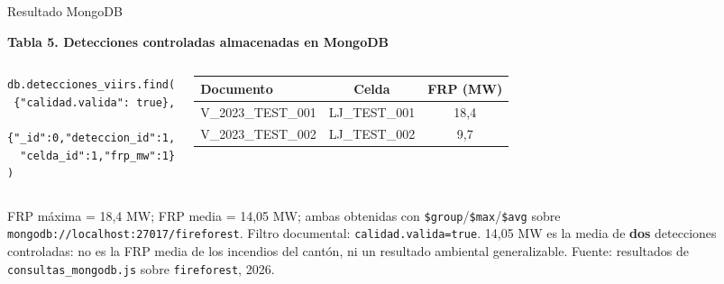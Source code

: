 \documentclass[aspectratio=169,11pt]{beamer}
\newcommand{\fuente}[1]{{\vfill\tiny\color{GrisTexto!70!black} Fuente: #1}}
\begin{document}
\begin{frame}[fragile]{Resultado MongoDB}
  \begin{center}
  \end{center}
  \vspace{0.15cm}
  \raggedright{\small\textbf{Tabla 5. Detecciones controladas almacenadas en MongoDB}\par}
  \vspace{0.05cm}
  \begin{columns}[T]
      \begin{footnotesize}
      \begin{verbatim}
db.detecciones_viirs.find(
 {"calidad.valida": true},
 {"_id":0,"deteccion_id":1,
  "celda_id":1,"frp_mw":1}
)
      \end{verbatim}
      \end{footnotesize}
      \scriptsize
      \begin{tabular}{@{}lcc@{}}
      \toprule
      \textbf{Documento} & \textbf{Celda} & \textbf{FRP (MW)} \\
      \midrule
      V\_2023\_TEST\_001 & LJ\_TEST\_001 & 18,4 \\
      V\_2023\_TEST\_002 & LJ\_TEST\_002 & 9,7 \\
      \bottomrule
      \end{tabular}
  \end{columns}
  \vspace{0.2cm}
  {\scriptsize FRP m\'axima = 18,4 MW; FRP media = 14,05 MW; ambas obtenidas con \texttt{\$group}/\texttt{\$max}/\texttt{\$avg} sobre \texttt{mongodb://localhost:27017/fireforest}. Filtro documental: \texttt{calidad.\allowbreak valida=true}.}
  \vspace{0.1cm}
  {\scriptsize\color{Fuego} 14,05 MW es la media de \textbf{dos} detecciones controladas: no es la FRP media de los incendios del cant\'on, ni un resultado ambiental generalizable.}
  \fuente{resultados de \texttt{consultas\_mongodb.js} sobre \texttt{fireforest}, 2026.}
\end{frame}
\end{document}
